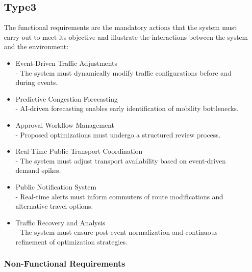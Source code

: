 \documentclass[a4paper,12pt]{article}
\begin{document}
\subsection*{Type3}
The functional requirements are the mandatory actions that the system must carry out to meet its objective and illustrate the interactions between the system and the environment:
\begin{itemize}
    \item{Event-Driven Traffic Adjustments} 
    \\- The system must dynamically modify traffic configurations before and during events.
    \item{Predictive Congestion Forecasting} 
    \\- AI-driven forecasting enables early identification of mobility bottlenecks.
    \item{Approval Workflow Management}
    \\- Proposed optimizations must undergo a structured review process.
    \item{Real-Time Public Transport Coordination}
    \\- The system must adjust transport availability based on event-driven demand spikes.
    \item{Public Notification System}
    \\- Real-time alerts must inform commuters of route modifications and alternative travel options.
    \item{Traffic Recovery and Analysis}
    \\- The system must ensure post-event normalization and continuous refinement of optimization strategies.
\end{itemize}

\subsubsection{Non-Functional Requirements}
\end{document}
